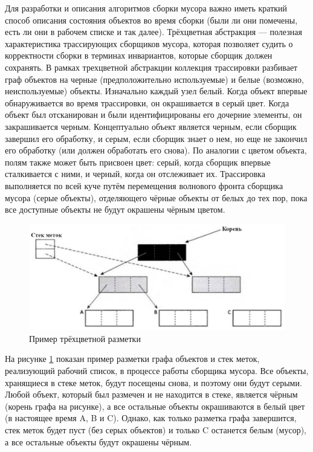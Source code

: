 Для разработки и описания алгоритмов сборки мусора важно иметь краткий способ описания состояния объектов во время сборки (были ли они помечены, есть ли они в рабочем списке и так далее). Трёхцветная абстракция --- полезная характеристика трассирующих сборщиков мусора, которая позволяет судить о корректности сборки в терминах инвариантов, которые сборщик должен сохранять. В рамках трехцветной абстракции коллекция трассировки разбивает граф объектов на черные (предположительно используемые) и белые (возможно, неиспользуемые) объекты. Изначально каждый узел белый. Когда объект впервые обнаруживается во время трассировки, он окрашивается в серый цвет. Когда объект был отсканирован и были идентифицированы его дочерние элементы, он закрашивается черным. Концептуально объект является черным, если сборщик завершил его обработку, и серым, если сборщик знает о нем, но еще не закончил его обработку (или должен обработать его снова). По аналогии с цветом объекта, полям также может быть присвоен цвет: серый, когда сборщик впервые сталкивается с ними, и черный, когда он отслеживает их. Трассировка выполняется по всей куче путём перемещения волнового фронта сборщика мусора (серые объекты), отделяющего чёрные объекты от белых до тех пор, пока все доступные объекты не будут окрашены чёрным цветом. \cite{handbook}

\begin{figure}[H]
	\centering
	\includegraphics[width=\textwidth]{assets/tricolor.png}
	\caption{Пример трёхцветной разметки}
	\label{fig:tricolor}
\end{figure}

На рисунке \ref{fig:tricolor} показан пример разметки графа объектов и стек меток, реализующий рабочий список, в процессе работы сборщика мусора. Все объекты, хранящиеся в стеке меток, будут посещены снова, и поэтому они будут серыми. Любой объект, который был размечен и не находится в стеке, является чёрным (корень графа на рисунке), а все остальные объекты окрашиваются в белый цвет (в настоящее время A, B и C). Однако, как только разметка графа завершится, стек меток будет пуст (без серых объектов) и только C останется белым (мусор), а все остальные объекты будут окрашены чёрным.

